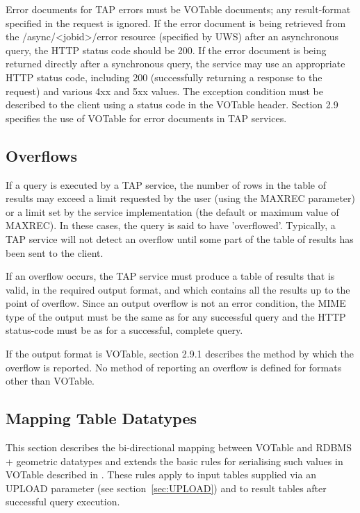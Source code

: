 \documentclass[11pt,letter]{ivoa}
\begin{document}
Error documents for TAP errors must be VOTable documents;  any result-format 
specified in the request is ignored. If the error document is being retrieved 
from the /async/<jobid>/error resource (specified by UWS) after an asynchronous 
query, the HTTP status code should be 200. If the error document is being 
returned directly after a synchronous query, the service may use an appropriate 
HTTP status code, including 200 (successfully returning a response to the 
request) and various 4xx and 5xx values. The exception condition must be 
described to the client using a status code in the VOTable header.  Section   
2.9 specifies the use of VOTable for error documents in TAP services. 

\subsection{Overflows}
\label{sec:query-overflow}

If a query is executed by a TAP service, the number of rows in the table of 
results may exceed a limit requested by the user (using the MAXREC parameter) 
or a limit set by the service implementation (the default or maximum value of 
MAXREC). In these cases, the query is said to have 'overflowed'. Typically, a 
TAP service will not detect an overflow until some part of the table of results 
has been sent to the client.

If an overflow occurs, the TAP service must produce a table of results that is 
valid, in the required output format, and which contains all the results up to 
the point of overflow. Since an output overflow is not an error condition, the 
MIME type of the output must be the same as for any successful query and the 
HTTP status-code must be as for a successful, complete query.

If the output format is VOTable, section 2.9.1 describes the method by which 
the overflow is reported. No method of reporting an overflow is defined for 
formats other than VOTable.

\subsection{Mapping Table Datatypes}
\label{sec:vot-rdbms}

This section describes the bi-directional mapping between VOTable and RDBMS + 
geometric datatypes and extends the basic rules for serialising such values in 
VOTable described in \citep{std:DALI}. These rules apply to input tables 
supplied via an UPLOAD parameter (see section~\ref{sec:UPLOAD}) and to result tables after successful 
query execution.
\end{document}
